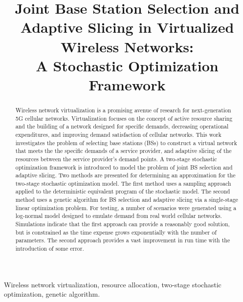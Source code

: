 \documentclass[conference]{IEEEtran}
\begin{document}
\title{Joint Base Station Selection and Adaptive Slicing in Virtualized Wireless Networks:\\A Stochastic Optimization Framework}

\author{
}

\maketitle

\begin{abstract}
Wireless network virtualization is a promising avenue of research for next-generation 5G cellular networks.  Virtualization focuses on the concept of active resource sharing and the building of a network designed for specific demands, decreasing operational expenditures, and improving demand satisfaction of cellular networks.  This work investigates the problem of selecting base stations (BSs) to construct a virtual network that meets the the specific demands of a service provider, and adaptive slicing of the resources between the service provider's demand points.  A two-stage stochastic optimization framework is introduced to model the problem of joint BS selection and adaptive slicing.  Two methods are presented for determining an approximation for the two-stage stochastic optimization model.  The first method uses a sampling approach applied to the deterministic equivalent program of the stochastic model.  The second method uses a genetic algorithm for BS selection and adaptive slicing via a single-stage linear optimization problem.  For testing, a number of scenarios were generated using a log-normal model designed to emulate demand from real world cellular networks.  Simulations indicate that the first approach can provide a reasonably good solution, but is constrained as the time expense grows exponentially with the number of parameters.  The second approach provides a vast improvement in run time with the introduction of some error.
\end{abstract}

\begin{IEEEkeywords}
Wireless network virtualization, resource allocation, two-stage stochastic optimization, genetic algorithm.
\end{IEEEkeywords}
\end{document}
